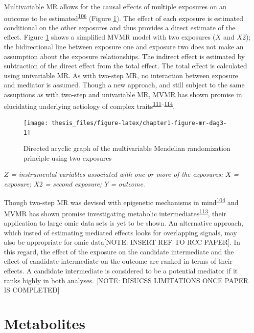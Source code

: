 \documentclass[11pt,twoside]{bristolthesis}
\newcommand{\bsmall}{\begin{small}}
\newcommand{\esmall}{\end{small}}
\begin{document}
Multivariable MR allows for the causal effects of multiple exposures on an outcome to be estimated\textsuperscript{\protect\hyperlink{ref-Sanderson2018}{106}} (Figure \ref{fig:chapter1-figure-mr-dag3}). The effect of each exposure is estimated conditional on the other exposures and thus provides a direct estimate of the effect. Figure \ref{fig:chapter1-figure-mr-dag3} shows a simplified MVMR model with two exposures (\(X\) and \(X2\)); the bidirectional line between exposure one and exposure two does not make an assumption about the exposure relationships. The indirect effect is estimated by subtraction of the direct effect from the total effect. The total effect is calculated using univariable MR. As with two-step MR, no interaction between exposure and mediator is assumed. Though a new approach, and still subject to the same assuptions as with two-step and univariable MR, MVMR has shown promise in elucidating underlying aetiology of complex traits\textsuperscript{\protect\hyperlink{ref-Carter2019}{111}--\protect\hyperlink{ref-Johnson2019}{114}}.
\begin{figure}
\texttt{[image: thesis\_files/figure-latex/chapter1-figure-mr-dag3-1]} \caption{Directed acyclic graph of the multivariable Mendelian randomization principle using two exposures}\label{fig:chapter1-figure-mr-dag3}
\end{figure}
\noindent
\bsmall
\emph{\(Z\) = instrumental variables associated with one or more of the exposures; \(X\) = exposure; \(X2\) = second exposure; \(Y\) = outcome.}
\esmall

Though two-step MR was devised with epigenetic mechanisms in mind\textsuperscript{\protect\hyperlink{ref-Relton2012}{104}} and MVMR has shown promise investigating metabolic intermediates\textsuperscript{\protect\hyperlink{ref-Richardson2019}{113}}, their application to large omic data sets is yet to be shown. An alternative approach, which insted of estimating mediated effects looks for overlapping signals, may also be appropriate for omic data{[}NOTE: INSERT REF TO RCC PAPER{]}. In this regard, the effect of the exposure on the candidate intermediate and the effect of candidate intermediate on the outcome are ranked in terms of their effects. A candidate intermediate is considered to be a potential mediator if it ranks highly in both analyses. {[}NOTE: DISUCSS LIMITATIONS ONCE PAPER IS COMPLETED{]}

\hypertarget{metabolites}{%
\section{Metabolites}\label{metabolites}}
\end{document}
